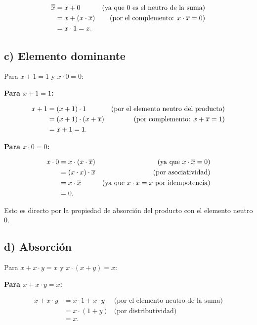 \documentclass[11pt,letterpaper]{article}
\begin{document}
\[
\begin{aligned}
\overline{\overline{x}} &= x + 0 & \text{(ya que 0 es el neutro de la suma)} \\
                        &= x + (x \cdot \overline{x}) & \text{(por el complemento: \( x \cdot \overline{x} = 0 \))} \\
                        &= x \cdot 1 = x.
\end{aligned}
\]

\subsection*{c) Elemento dominante}

Para \( x + 1 = 1 \) y \( x \cdot 0 = 0 \):

\textbf{Para \( x + 1 = 1 \):}

\[
\begin{aligned}
x + 1 &= (x + 1) \cdot 1 & \text{(por el elemento neutro del producto)} \\
      &= (x + 1) \cdot (x + \overline{x}) & \text{(por complemento: \( x + \overline{x} = 1 \))} \\
      &= x + 1 = 1.
\end{aligned}
\]

\textbf{Para \( x \cdot 0 = 0 \):}

\[
\begin{aligned}
x \cdot 0 &= x \cdot (x \cdot \overline{x}) & \text{(ya que \( x \cdot \overline{x} = 0 \))} \\
          &= (x \cdot x) \cdot \overline{x} & \text{(por asociatividad)} \\
          &= x \cdot \overline{x} & \text{(ya que \( x \cdot x = x \) por idempotencia)} \\
          &= 0.
\end{aligned}
\]

Esto es directo por la propiedad de absorción del producto con el elemento neutro \( 0 \).

\subsection*{d) Absorción}

Para \( x + x \cdot y = x \) y \( x \cdot (x + y) = x \):

\textbf{Para \( x + x \cdot y = x \):}

\[
\begin{aligned}
x + x \cdot y &= x \cdot 1 + x \cdot y & \text{(por el elemento neutro de la suma)} \\
              &= x \cdot (1 + y) & \text{(por distributividad)} \\
              &= x.
\end{aligned}
\]
\end{document}
